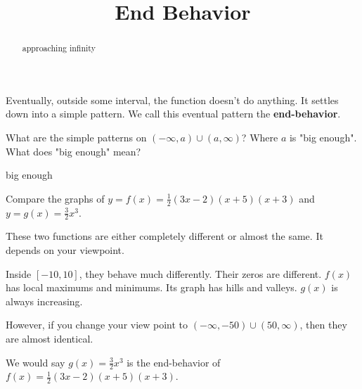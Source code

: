 \documentclass{ximera}
\title{End Behavior}
\begin{document}
\begin{abstract}
approaching infinity
\end{abstract}
\maketitle







Eventually, outside some interval, the function doesn't do anything.  It settles down into a simple pattern.  We call this eventual pattern the \textbf{end-behavior}.



What are the simple patterns on $(-\infty, a) \cup (a, \infty)$?  Where $a$ is "big enough".  What does "big enough" mean?




\begin{example} big enough





Compare the graphs of $y = f(x) = \frac{1}{2}(3x-2)(x+5)(x+3)$ and $y=g(x) = \frac{3}{2}x^3$.



\begin{center}
\end{center}







\begin{center}
\end{center}







These two functions are either completely different or almost the same.  It depends on your viewpoint.

Inside $[-10, 10]$, they behave much differently. Their zeros are different.  $f(x)$ has local maximums and minimums.  Its graph has hills and valleys.  $g(x)$ is always increasing.

However, if you change your view point to $(-\infty, -50) \cup (50, \infty)$, then they are almost identical.



We would say $g(x) = \frac{3}{2}x^3$ is the end-behavior of $f(x) = \frac{1}{2}(3x-2)(x+5)(x+3)$.






\end{example}
\end{document}
